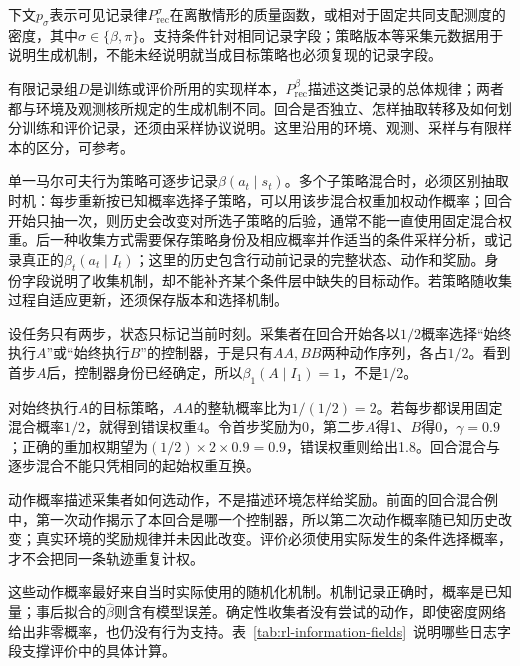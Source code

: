 下文$p_\sigma$表示可见记录律$P_{\mathrm{rec}}^\sigma$在离散情形的质量函数，或相对于固定共同支配测度的密度，其中$\sigma\in\{\beta,\pi\}$。支持条件针对相同记录字段；策略版本等采集元数据用于说明生成机制，不能未经说明就当成目标策略也必须复现的记录字段。

有限记录组$D$是训练或评价所用的实现样本，$P_{\mathrm{rec}}^\beta$描述这类记录的总体规律；两者都与环境及观测核所规定的生成机制不同。回合是否独立、怎样抽取转移及如何划分训练和评价记录，还须由采样协议说明。这里沿用的环境、观测、采样与有限样本的区分，可参考。

单一马尔可夫行为策略可逐步记录$\beta(a_t\mid s_t)$。多个子策略混合时，必须区别抽取时机：每步重新按已知概率选择子策略，可以用该步混合权重加权动作概率；回合开始只抽一次，则历史会改变对所选子策略的后验，通常不能一直使用固定混合权重。后一种收集方式需要保存策略身份及相应概率并作适当的条件采样分析，或记录真正的$\beta_t(a_t\mid I_t)$；这里的历史包含行动前记录的完整状态、动作和奖励。身份字段说明了收集机制，却不能补齐某个条件层中缺失的目标动作。若策略随收集过程自适应更新，还须保存版本和选择机制。

\begin{example}[回合只抽一次控制器]
  \label{ex:rl-information-collector-mixture}
  设任务只有两步，状态只标记当前时刻。采集者在回合开始各以$1/2$概率选择“始终执行$A$”或“始终执行$B$”的控制器，于是只有$AA,BB$两种动作序列，各占$1/2$。看到首步$A$后，控制器身份已经确定，所以$\beta_1(A\mid I_1)=1$，不是$1/2$。

  对始终执行$A$的目标策略，$AA$的整轨概率比为$1/(1/2)=2$。若每步都误用固定混合概率$1/2$，就得到错误权重4。令首步奖励为0，第二步$A$得1、$B$得0，$\gamma=0.9$；正确的重加权期望为$(1/2)\times2\times0.9=0.9$，错误权重则给出1.8。回合混合与逐步混合不能只凭相同的起始权重互换。
\end{example}

动作概率描述采集者如何选动作，不是描述环境怎样给奖励。前面的回合混合例中，第一次动作揭示了本回合是哪一个控制器，所以第二次动作概率随已知历史改变；真实环境的奖励规律并未因此改变。评价必须使用实际发生的条件选择概率，才不会把同一条轨迹重复计权。

这些动作概率最好来自当时实际使用的随机化机制。机制记录正确时，概率是已知量；事后拟合的$\widehat\beta$则含有模型误差。确定性收集者没有尝试的动作，即使密度网络给出非零概率，也仍没有行为支持。表~\ref{tab:rl-information-fields}~说明哪些日志字段支撑评价中的具体计算。

